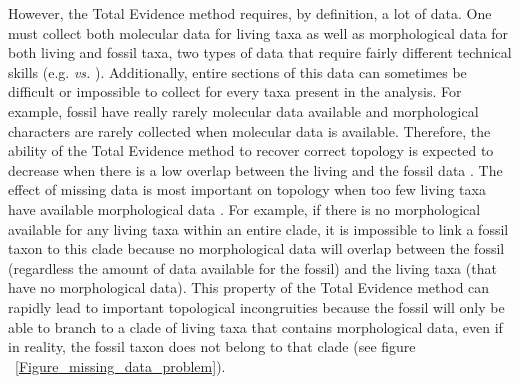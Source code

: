 \documentclass[12pt,letterpaper]{article}
\begin{document}
However, the Total Evidence method requires, by definition, a lot of data. One must collect both molecular data for living taxa as well as morphological data for both living and fossil taxa, two types of data that require fairly different technical skills (e.g. \cite{meredithimpacts2011} \textit{vs.} \cite{O'Leary08022013}). Additionally, entire sections of this data can sometimes be difficult or impossible to collect for every taxa present in the analysis. For example, fossil have really rarely molecular data available and morphological characters are rarely collected when molecular data is available. Therefore, the ability of the Total Evidence method to recover correct topology is expected to decrease when there is a low overlap between the living and the fossil data \cite{GuillermeCooper}. The effect of missing data is most important on topology when too few living taxa have available morphological data \cite{GuillermeCooper}. For example, if there is no morphological available for any living taxa within an entire clade, it is impossible to link a fossil taxon to this clade because no morphological data will overlap between the fossil (regardless the amount of data available for the fossil) and the living taxa (that have no morphological data). This property of the Total Evidence method can rapidly lead to important topological incongruities because the fossil will only be able to branch to a clade of living taxa that contains morphological data, even if in reality, the fossil taxon does not belong to that clade \cite{GuillermeCooper} (see figure ~\ref{Figure_missing_data_problem}).
\end{document}
